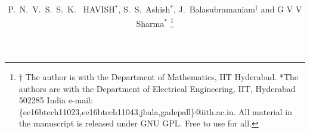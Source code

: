 \documentclass[journal,12pt,twocolumn]{IEEEtran}
\begin{document}
\let\StandardTheFigure\thefigure
\renewcommand{\thefigure}{\theproblem}



\def\putbox#1#2#3{\makebox[0in][l]{\makebox[#1][l]{}\raisebox{\baselineskip}[0in][0in]{\raisebox{#2}[0in][0in]{#3}}}}
     \def\rightbox#1{\makebox[0in][r]{#1}}
     \def\centbox#1{\makebox[0in]{#1}}
     \def\topbox#1{\raisebox{-\baselineskip}[0in][0in]{#1}}
     \def\midbox#1{\raisebox{-0.5\baselineskip}[0in][0in]{#1}}

\vspace{3cm}

\title{ 
}


%
%
%

\author{P.~N.~V.~S.~S.~K.~ HAVISH$^{*}$, S.~S.~Ashish$^{*}$, J.~Balasubramaniam$^{\dagger}$ and G V V Sharma$^{*}$ %
\thanks{$\dagger$ The author is with the Department of Mathematics, IIT Hyderabad.  *The authors are with the Department
of Electrical Engineering, IIT, Hyderabad
502285 India e-mail: \{ee16btech11023,ee16btech11043,jbala,gadepall\}@iith.ac.in. All material in the manuscript is released under GNU GPL.  Free to use for all.}%
}
% 
%
\end{document}
